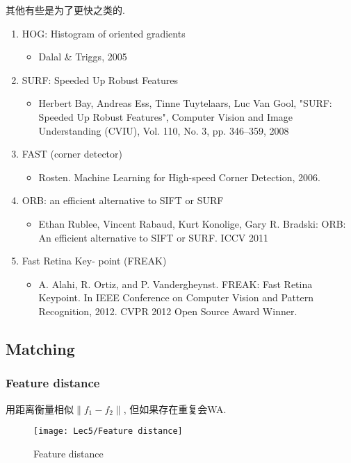 其他有些是为了更快之类的. 
\begin{enumerate}
    \item HOG: Histogram of oriented gradients
    \begin{itemize}
        \item  Dalal \& Triggs, 2005
    \end{itemize}
    \item SURF: Speeded Up Robust Features
    \begin{itemize}
        \item  Herbert Bay, Andreas Ess, Tinne Tuytelaars, Luc Van Gool, "SURF: Speeded Up Robust Features", Computer Vision and Image Understanding (CVIU), Vol. 110, No. 3, pp. 346--359, 2008
    \end{itemize}
    \item FAST (corner detector)
    \begin{itemize}
        \item  Rosten. Machine Learning for High-speed Corner Detection, 2006.
    \end{itemize}
    \item ORB: an efficient alternative to SIFT or SURF
    \begin{itemize}
        \item  Ethan Rublee, Vincent Rabaud, Kurt Konolige, Gary R. Bradski: ORB: An efficient alternative to SIFT or SURF. ICCV 2011
    \end{itemize}
    \item Fast Retina Key- point (FREAK)
    \begin{itemize}
        \item  A. Alahi, R. Ortiz, and P. Vandergheynst. FREAK: Fast Retina Keypoint. In IEEE Conference on Computer Vision and Pattern Recognition, 2012. CVPR 2012
        Open Source Award Winner.
    \end{itemize}
\end{enumerate}


\subsection{Matching}

\subsubsection{Feature distance}
用距离衡量相似$\left\| f_1-f_2\right\|$, 但如果存在重复会WA.
\begin{figure}[H]
    \centering
    \texttt{[image: Lec5/Feature distance]}
    \caption{Feature distance}
\end{figure}

